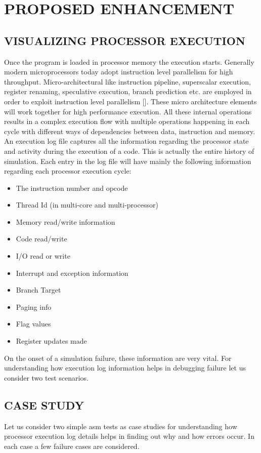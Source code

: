 \chapter{PROPOSED ENHANCEMENT}
\label{chap:enhancement.tex}

\section {VISUALIZING PROCESSOR EXECUTION}

Once the program is loaded in processor memory the execution starts. Generally modern microprocessors today adopt instruction level parallelism for high throughput. Micro-architectural like instruction pipeline, superscalar execution, register renaming, speculative execution, branch prediction etc. are employed in order to exploit instruction level parallelism [].  These micro architecture elements will work together for high performance execution. All these internal operations results in a complex execution flow with multiple operations happening in each cycle with different ways of dependencies between data, instruction and memory.
An execution log file captures all the information regarding the processor state and activity during the execution of a code. This is actually the entire history of simulation. Each entry in the log file will have mainly the following information regarding each processor execution cycle:
\begin{itemize}
	\item The instruction number and opcode
	\item Thread Id (in multi-core and multi-processor)
	\item Memory read/write information
	\item Code read/write
	\item I/O read or write
	\item Interrupt and exception information
	\item Branch Target
	\item Paging info
	\item Flag values
	\item Register updates made
\end{itemize}
On the onset of a simulation failure, these information are very vital. For understanding how execution log information helps in debugging failure let us consider two test scenarios.

\section {CASE STUDY}
Let us consider two simple asm tests as case studies for understanding how processor execution log details helps in finding out why and how errors occur. In each case a few failure cases are considered. 
